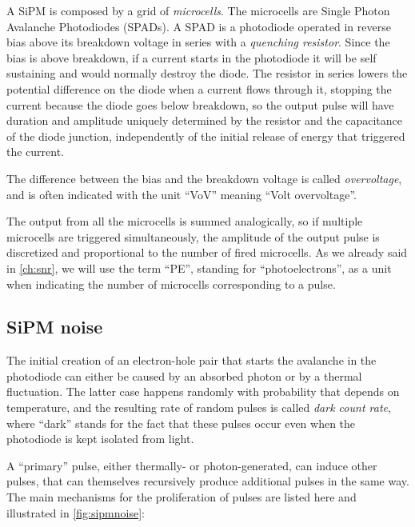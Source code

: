 A SiPM is composed by a grid of \emph{microcells}. The microcells are Single
Photon Avalanche Photodiodes (SPADs). A SPAD is a photodiode operated in
reverse bias above its breakdown voltage in series with a \emph{quenching
resistor}. Since the bias is above breakdown, if a current starts in the
photodiode it will be self sustaining and would normally destroy the diode. The
resistor in series lowers the potential difference on the diode when a current
flows through it, stopping the current because the diode goes below breakdown,
so the output pulse will have duration and amplitude uniquely determined by the
resistor and the capacitance of the diode junction, independently of the
initial release of energy that triggered the current.

The difference between the bias and the breakdown voltage is called
\emph{overvoltage}, and is often indicated with the unit ``\si{VoV}'' meaning
``Volt overvoltage''.

The output from all the microcells is summed analogically, so if multiple microcells are
triggered simultaneously, the amplitude of the output pulse is discretized and
proportional to the number of fired microcells. As we already said in
\autoref{ch:snr}, we will use the term ``PE'', standing for ``photoelectrons'',
as a unit when indicating the number of microcells corresponding to a pulse.

\subsection{SiPM noise}
\label{sec:sipmnoise}

The initial creation of an electron-hole pair that starts the avalanche in the
photodiode can either be caused by an absorbed photon or by a thermal
fluctuation. The latter case happens randomly with probability that depends on
temperature, and the resulting rate of random pulses is called \emph{dark count
rate}, where ``dark'' stands for the fact that these pulses occur even when the
photodiode is kept isolated from light.

A ``primary'' pulse, either thermally- or photon-generated, can induce other
pulses, that can themselves recursively produce additional pulses in the same
way. The main mechanisms for the proliferation of pulses are listed here and
illustrated in \autoref{fig:sipmnoise}:

